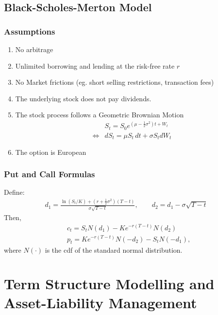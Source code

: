 \documentclass[11pt]{article}
\begin{document}
	\subsection{Black-Scholes-Merton Model}
	\subsubsection{Assumptions}
	\begin{enumerate}
		\item No arbitrage
		\item Unlimited borrowing and lending at the risk-free rate \( r \)
		\item No Market frictions (eg. short selling restrictions, transaction fees)
		\item The underlying stock does not pay dividends.
		\item The stock process follows a Geometric Brownian Motion
		\begin{align*}
			&S_t = S_0 e^{\left(\mu - \frac{1}{2} \sigma^2\right)t + W_t}
			\\[4pt]
			\iff &dS_t = \mu S_t \, dt + \sigma S_t dW_t
		\end{align*}
		\item The option is European
	\end{enumerate}
	\subsubsection{Put and Call Formulas}
	Define:
	\begin{align*}
		d_1 = \frac{\ln\left(S_t/ K\right) +\left(r + \frac{1}{2}\sigma^2\right)(T - t)}{\sigma\sqrt{T - t}},\qquad d_2 
		= d_1 - \sigma\sqrt{T - t}
	\end{align*}
	Then,
	\begin{align*}
		& c_t = S_tN(d_1) - Ke^{-r(T - t)}N(d_2)\\[4pt]
		& p_t = Ke^{-r(T - t)}N(-d_2) - S_t N(-d_1),
	\end{align*}
	where \( N(\cdot) \) is the cdf of the standard normal distribution.
	\section{Term Structure Modelling and Asset-Liability Management}
\end{document}
